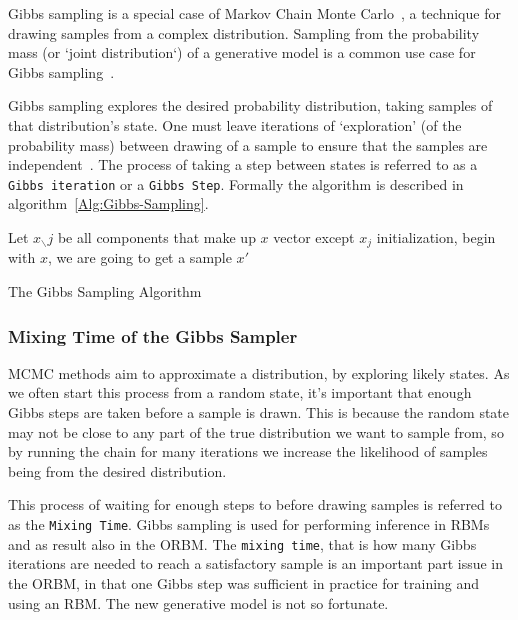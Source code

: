 Gibbs sampling is a special case of Markov Chain Monte Carlo~\cite{hastings70}, a technique for drawing samples from a complex distribution. Sampling from the probability mass (or `joint distribution`) of a generative model is a common use case for Gibbs sampling~\cite{Pearl:1988:PRI:52121}.

Gibbs sampling explores the desired probability distribution, taking samples of that distribution's state. One must leave iterations of `exploration' (of the probability mass) between drawing of a sample to ensure that the samples are independent~\cite{casella1992explaining}. The process of taking a step between states is referred to as a \texttt{Gibbs iteration} or a \texttt{Gibbs Step}. Formally the algorithm is described in algorithm~\ref{Alg:Gibbs-Sampling}.

\begin{algorithm}[!ht]
 Let $ x_{\smallsetminus} j$ be all components that make up $x$ vector except $x_j$\;
 initialization, begin with $x$, we are going to get a sample $x'$\;
 \caption{The Gibbs Sampling Algorithm}\label{Alg:Gibbs-Sampling}
\end{algorithm}

\subsubsection{Mixing Time of the Gibbs Sampler}

MCMC methods aim to approximate a distribution, by exploring likely states. As we often start this process from a random state, it's important that enough Gibbs steps are taken before a sample is drawn. This is because the random state may not be close to any part of the true distribution we want to sample from, so by running the chain for many iterations we increase the likelihood of samples being from the desired distribution.

This process of waiting for enough steps to before drawing samples is referred to as the \texttt{Mixing Time}. Gibbs sampling is used for performing inference in RBMs~\cite{Hinton:2006:FLA:1161603.1161605} and as result also in the ORBM. The \texttt{mixing time}, that is how many Gibbs iterations are needed to reach a satisfactory sample is an important part issue in the ORBM, in that one Gibbs step was sufficient in practice for training and using an RBM. The new generative model is not so fortunate.

